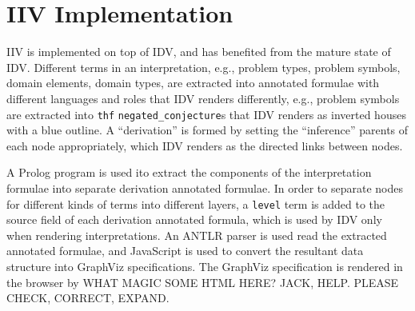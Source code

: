\documentclass[letterpaper]{article}
\newcommand{\smalltt}[1]{\small \texttt{#1}}
\begin{document}
{%
\section{IIV Implementation}
\label{Implementation}

IIV is implemented on top of IDV, and has benefited from the mature state of IDV.
Different terms in an interpretation, e.g., problem types, problem symbols, domain elements,
domain types, are extracted into annotated formulae with different languages and roles that
IDV renders differently, e.g., problem symbols are extracted into {\smalltt{thf}} 
{\smalltt{negated\_conjecture}}s that IDV renders as inverted houses with a blue outline.
A ``derivation'' is formed by setting the ``inference'' parents of each node appropriately,
which IDV renders as the directed links between nodes.

A Prolog program is used ito extract the components of the interpretation formulae into 
separate derivation annotated formulae.
In order to separate nodes for different kinds of terms into different layers, a {\smalltt{level}}
term is added to the source field of each derivation annotated formula, which is used by IDV only
when rendering interpretations.
An ANTLR parser is used read the extracted annotated formulae, and JavaScript is used to convert
the resultant data structure into GraphViz \cite{EG+02} specifications.
The GraphViz specification is rendered in the browser by 
WHAT MAGIC SOME HTML HERE? JACK, HELP. PLEASE CHECK, CORRECT, EXPAND.

}
\end{document}
